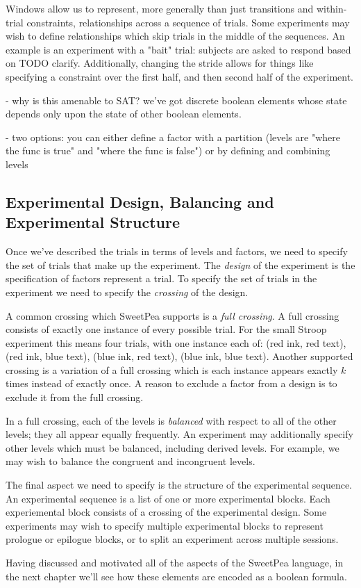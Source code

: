 Windows allow us to represent, more generally than just transitions and within-trial constraints, relationships across a sequence of trials. Some experiments may wish to define relationships which skip trials in the middle of the sequences. An example is an experiment with a "bait" trial: subjects are asked to respond based on  TODO clarify. Additionally, changing the stride allows for things like specifying a constraint over the first half, and then second half of the experiment.


- why is this amenable to SAT? we've got discrete boolean elements whose state depends only upon the state of other boolean elements.

- two options: you can either define a factor with a partition (levels are "where the func is true" and "where the func is false") or by defining and combining levels


\subsection{Experimental Design, Balancing and Experimental Structure}

Once we've described the trials in terms of levels and factors, we need to specify the set of trials that make up the experiment. The \emph{design} of the experiment is the specification of factors represent a trial. To specify the set of trials in the experiment we need to specify the \emph{crossing} of the design.

A common crossing which SweetPea supports is a \emph{full crossing}. A full crossing consists of exactly one instance of every possible trial. For the small Stroop experiment this means four trials, with one instance each of: (red ink, red text), (red ink, blue text), (blue ink, red text), (blue ink, blue text). Another supported crossing is a variation of a full crossing which is each instance appears exactly $k$ times instead of exactly once. A reason to exclude a factor from a design is to exclude it from the full crossing.

In a full crossing, each of the levels is \emph{balanced} with respect to all of the other levels; they all appear equally frequently. An experiment may additionally specify other levels which must be balanced, including derived levels. For example, we may wish to balance the congruent and incongruent levels.

The final aspect we need to specify is the structure of the experimental sequence. An experimental sequence is a list of one or more experimental blocks. Each experiemental block consists of a crossing of the experimental design. Some experiments may wish to specify multiple experimental blocks to represent prologue or epilogue blocks, or to split an experiment across multiple sessions.

Having discussed and motivated all of the aspects of the SweetPea language, in the next chapter we'll see how these elements are encoded as a boolean formula.
